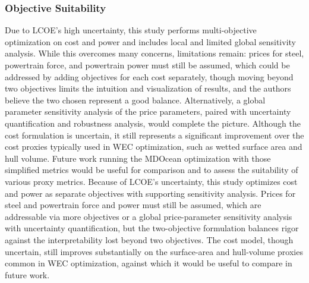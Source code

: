 \subsubsection{Objective Suitability}
\ifdefined\DISSERTATION
    Due to LCOE's high uncertainty, this study performs multi-objective optimization on cost and power and includes local and limited global sensitivity analysis.
    While this overcomes many concerns, limitations remain: prices for steel, powertrain force, and powertrain power must still be assumed, which could be addressed by adding objectives for each cost separately, though moving beyond two objectives limits the intuition and visualization of results, and the authors believe the two chosen represent a good balance.
    Alternatively, a global parameter sensitivity analysis of the price parameters, paired with uncertainty quantification and robustness analysis, would complete the picture.
    Although the cost formulation is uncertain, it still represents a significant improvement over the cost proxies typically used in WEC optimization, such as wetted surface area and hull volume.
    Future work running the MDOcean optimization with those simplified metrics would be useful for comparison and to assess the suitability of various proxy metrics.
\else
    Because of LCOE's uncertainty, this study optimizes cost and power as separate objectives with supporting sensitivity analysis.
    Prices for steel and powertrain force and power must still be assumed, which are addressable via more objectives or a global price-parameter sensitivity analysis with uncertainty quantification,
    but the two-objective formulation balances rigor against the interpretability lost beyond two objectives.
    The cost model, though uncertain, still improves substantially on the surface-area and hull-volume proxies common in WEC optimization, against which it would be useful to compare in future work.
\fi




